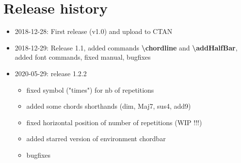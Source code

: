 \documentclass[11pt]{article}
\newcommand{\btt}{\bfseries \ttfamily }
\newcommand{\tbs}{\textbackslash{}}
\begin{document}
\section{Release history}

\begin{itemize}
\item 2018-12-28: First release (v1.0) and upload to CTAN

\item 2018-12-29: Release 1.1, added commands {\btt \tbs chordline} and {\btt \tbs addHalfBar}, added font commands, fixed manual, bugfixes

\item 2020-05-29: release 1.2.2
\begin{itemize}
\item fixed symbol ("times") for nb of repetitions
\item added some chords shorthands (dim, Maj7, sus4, add9)
\item fixed horizontal position of number of repetitions (WIP !!!)
\item added starred version of environment chordbar
\item bugfixes
\end{itemize}

\end{itemize}
\end{document}

